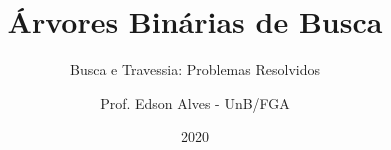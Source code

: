 \title{Árvores Binárias de Busca}
\subtitle{Busca e Travessia: Problemas Resolvidos}
\author{Prof. Edson Alves - UnB/FGA}
\date{2020}
